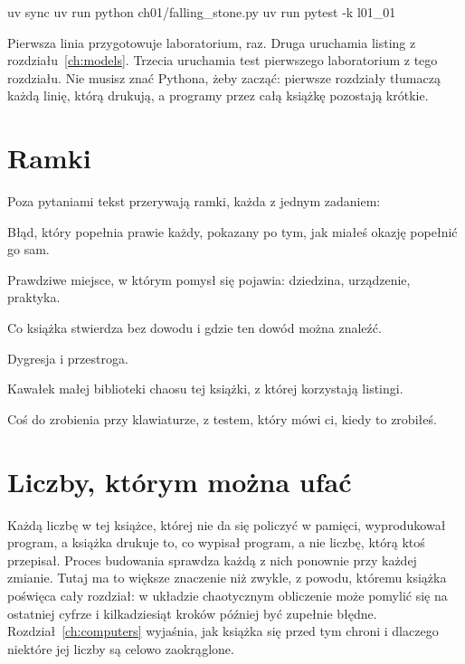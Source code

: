 \begin{shellcmd}
uv sync
uv run python ch01/falling_stone.py
uv run pytest -k l01_01
\end{shellcmd}

Pierwsza linia przygotowuje laboratorium, raz. Druga uruchamia listing z
rozdziału~\ref{ch:models}. Trzecia uruchamia test pierwszego laboratorium z
tego rozdziału. Nie musisz znać Pythona, żeby zacząć: pierwsze rozdziały
tłumaczą każdą linię, którą drukują, a programy przez całą książkę pozostają
krótkie.

\section*{Ramki}

Poza pytaniami tekst przerywają ramki, każda z jednym zadaniem:

\begin{description}[leftmargin=1.2em, itemsep=2pt]
  \item[\lblTrap.] Błąd, który popełnia prawie każdy, pokazany po tym, jak
    miałeś okazję popełnić go sam.
  \item[\lblWorld.] Prawdziwe miejsce, w którym pomysł się pojawia:
    dziedzina, urządzenie, praktyka.
  \item[\lblRigour.] Co książka stwierdza bez dowodu i gdzie ten dowód
    można znaleźć.
  \item[\lblNote, \lblWarning.] Dygresja i przestroga.
  \item[\lblProject.] Kawałek małej biblioteki chaosu tej książki, z której
    korzystają listingi.
  \item[\lblLab.] Coś do zrobienia przy klawiaturze, z testem, który mówi
    ci, kiedy to zrobiłeś.
\end{description}

\section*{Liczby, którym można ufać}

Każdą liczbę w tej książce, której nie da się policzyć w pamięci,
wyprodukował program, a książka drukuje to, co wypisał program, a nie liczbę,
którą ktoś przepisał. Proces budowania sprawdza każdą z nich ponownie przy
każdej zmianie. Tutaj ma to większe znaczenie niż zwykle, z powodu, któremu
książka poświęca cały rozdział: w układzie chaotycznym obliczenie może pomylić
się na ostatniej cyfrze i kilkadziesiąt kroków później być zupełnie błędne.
Rozdział~\ref{ch:computers} wyjaśnia, jak książka się przed tym chroni i
dlaczego niektóre jej liczby są celowo zaokrąglone.

